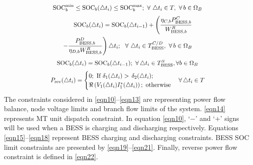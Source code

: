 \documentclass[journal]{IEEEtran}
\newcommand*\Laplace{\mathop{}\!\mathbin\bigtriangleup}
\begin{document}
    \begin{equation}
        \scalebox{0.9}[0.9]{$        
    \text{SOC}_{b}^{\min }\le {\text{SO{C}}_{b}}(\Laplace {{t}_{i}})\le \text{SOC}_{b}^{\max }; ~\forall \,\Laplace {{t}_{i}}\in T, ~\forall \,b\in {{\Omega }_{B}}
    $}
    \label{eqn19}
    \end{equation}
    \begin{equation}
        \scalebox{0.9}[0.9]{$    
    \begin{split}
{\text{SO{C}}_{b}}(\Laplace {{t}_{i}})={\text{SO{C}}_{b}}(\Laplace {{t}_{i-1}})+\Bigg( \frac{{{\eta }_{C,b}}P_{\text{BESS},b}^{C}}{W_{\text{BESS},b}^{R}} \\ 
    -\frac{P_{\text{BESS},b}^{D}}{{{\eta }_{D,b}}W_{\text{BESS},b}^{R}}\Bigg)\Laplace t_i; 
        ~~ \forall \,\Laplace {{t}_{i}}\in T_{\text{BESS}}^{C/D}, ~\forall \,b\in {{\Omega }_{B}}
    \end{split}
    $}
    \label{eqn20}
    \end{equation}
    \begin{equation}
        \scalebox{0.9}[0.9]{$
    \text{SOC}_{b}(\Laplace {{t}_{i}})={\text{SO{C}}_{b}}(\Laplace {{t}_{i-1}}); ~\forall \Laplace {{t}_{i}} \in T_{\text{BESS}}^{S},\forall b\in {{\Omega }_{B}}
  $}
    \label{eqn21}
    \end{equation}
    \begin{equation} %
    \scalebox{0.89}[0.9]{$
    {{P}_{\text{rev}}}(\Laplace {{t}_{i}})=
    \begin{cases}
 0;~\text{If}~{{\delta }_{1}}(\Laplace {{t}_{i}})>\,{{\delta }_{2}}(\Laplace {{t}_{i}});\\
\Re \left( {{V}_{1}}(\Laplace {{t}_{i}})I_{1}^{*}(\Laplace {{t}_{i}}) \right);~\text{otherwise}
    \end{cases}
  \forall \Laplace {{t}_{i}}\in {T} 
    $}
    \label{eqn22}    
    \end{equation}
 The constraints considered in \eqref{eqn10}--\eqref{eqn13} are representing power flow balance, node voltage limits and branch flow limits of the system. \eqref{eqn14} represents MT unit dispatch constraint. In equation \eqref{eqn10}, `$-$' and `$+$' signs will be used when a BESS is charging and discharging respectively.  Equations \eqref{eqn15}--\eqref{eqn18} represent BESS charging and discharging constraints. BESS SOC limit constraints are presented by \eqref{eqn19}--\eqref{eqn21}. Finally, reverse power flow constraint is defined in \eqref{eqn22}.
\end{document}
